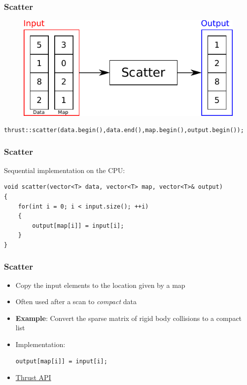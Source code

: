 \documentclass[aspectratio=169,handout]{beamer}
\begin{document}
\begin{frame}[fragile]
\frametitle{Scatter}
\begin{figure}
	\centering
	\includegraphics[height=0.6\textheight]{o_scatter}
\end{figure}

\begin{lstlisting}
thrust::scatter(data.begin(),data.end(),map.begin(),output.begin());
\end{lstlisting}
\end{frame}


\begin{frame}[fragile]
	\frametitle{Scatter}
	Sequential implementation on the CPU:
\begin{lstlisting}
void scatter(vector<T> data, vector<T> map, vector<T>& output)
{
	for(int i = 0; i < input.size(); ++i)
	{
		output[map[i]] = input[i];
	}
}
\end{lstlisting}
\end{frame}



\begin{frame}[fragile]
\frametitle{Scatter}
	\begin{itemize}
	\item Copy the input elements to the location given by a map
	\item<2-> Often used after a scan to \textit{compact} data
	\item<2-> \textbf{Example}: Convert the sparse matrix of rigid body collisions to a compact list
	\item<3-> Implementation:

\begin{lstlisting}
output[map[i]] = input[i];
\end{lstlisting}
	\item<3-> \href{https://thrust.github.io/doc/group__scattering.html}{Thrust API}
\end{itemize} 	
\end{frame}
\end{document}

